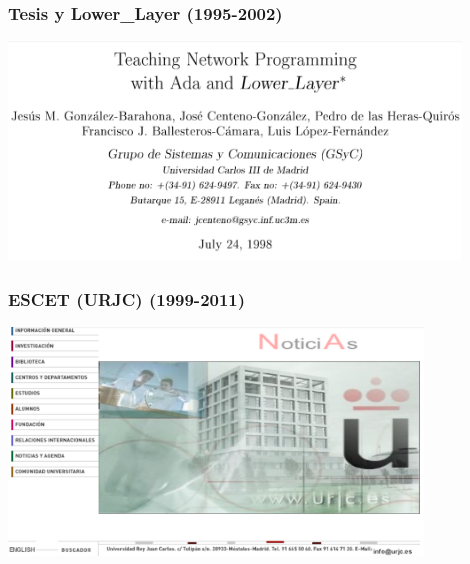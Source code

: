 \begin{frame}[fragile]
  \frametitle{Tesis y Lower\_Layer (1995-2002)}

  \begin{center}
  \includegraphics[width=12cm]{figs/lower-layer}
  \end{center}  
  
\end{frame}

\begin{frame}[fragile]
  \frametitle{ESCET (URJC) (1999-2011)}

  \begin{center}
  \includegraphics[width=11cm]{figs/web-urjc-2001}
  \end{center}  
  
\end{frame}


